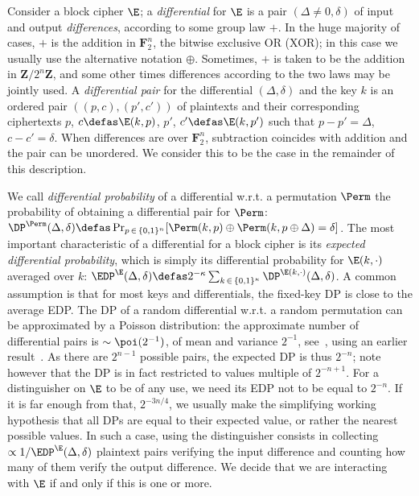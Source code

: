 Consider a block cipher $\E$; a \emph{differential} for $\E$ is a pair $(\Delta \neq 0,\delta)$ of input and output \emph{differences},
according to some group law $+$.
In the huge majority of cases, $+$ is the addition in $\mathbf{F}_2^n$,
\ie the bitwise exclusive OR (XOR); in this case we usually use the alternative notation $\oplus$. Sometimes, $+$
is taken to be the addition in $\mathbf{Z}/2^n\mathbf{Z}$, and some other times differences according to the two laws may be jointly used.
A \emph{differential pair} for the differential $(\Delta,\delta)$ and the key $k$ is an ordered pair $((p,c), (p',c'))$
of plaintexts and their corresponding ciphertexts
$p$, $c \defas \E(k,p)$, $p'$, $c' \defas \E(k,p')$ such that $p - p' = \Delta$, $c - c' = \delta$. When differences are over $\mathbf{F}_2^n$,
subtraction coincides with addition and the pair can be unordered. We consider this to be the case in the remainder of this description.

We call \emph{differential probability} of a differential w.r.t. a permutation $\Perm$ the probability of obtaining a differential pair
for $\Perm$:
$\DP^{\Perm}(\Delta,\delta) \defas \Pr_{p\,\in\,\{0,1\}^n}[\Perm(k,p) \oplus \Perm(k,p \oplus \Delta) = \delta]$.
The most important characteristic of a differential for a block cipher is its \emph{expected differential probability}, which
is simply its differential probability for $\E(k,\cdot)$ averaged over $k$:
$\EDP^{\E}(\Delta,\delta) \defas 2^{-\kappa}\sum_{k\,\in\,\{0,1\}^\kappa} \DP^{\E(k,\cdot)}(\Delta,\delta)$.
A common assumption is that for most keys and differentials, the fixed-key DP is close to the average EDP.
The DP of a random differential w.r.t. a random permutation can be approximated by
a Poisson distribution: the approximate number of differential pairs is $\sim \poi(2^{-1})$, of mean and variance $2^{-1}$,
see~\cite{DBLP:journals/jmc/DaemenR07}, using an earlier result~\cite{DBLP:journals/joc/OConnor95}.
As there are $2^{n-1}$ possible pairs, the expected DP is thus $2^{-n}$; note however that the DP is in fact restricted to values multiple of $2^{-n+1}$.
For a distinguisher on $\E$ to be of any use, we need its EDP not to be equal to $2^{-n}$. If it is far enough
from that, \eg $2^{-3n/4}$, we usually make the simplifying working hypothesis that all DPs are equal to their expected value, or rather the nearest
possible values.
In such a case, using the distinguisher consists in collecting $\propto 1/\EDP^{\E}(\Delta,\delta)$ plaintext pairs verifying
the input difference and counting how many of them verify the output difference. We decide that we are interacting with $\E$ if and only if this is one or more.

